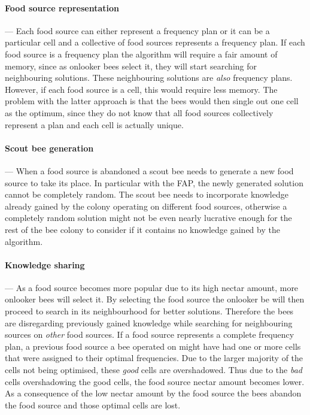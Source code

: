 \paragraph{Food source representation}
--- Each food source can either represent a frequency plan or it can be a particular cell and a collective of food sources represents a frequency plan. If each food source is a frequency plan the algorithm will require a fair amount of memory, since as onlooker bees select it, they will start searching for neighbouring solutions. These neighbouring solutions are \emph{also} frequency plans. However, if each food source is a cell, this would require less memory. The problem with the latter approach is that the bees would then single out one cell as the optimum, since they do not know that all food sources collectively represent a plan and each cell is actually unique.
\paragraph{Scout bee generation}
--- When a food source is abandoned a scout bee needs to generate a new food source to take its place. In particular with the \gls{FAP}, the newly generated solution cannot be completely random. The scout bee needs to incorporate knowledge already gained by the colony operating on different food sources, otherwise a completely random solution might not be even nearly lucrative enough for the rest of the bee colony to consider if it contains no knowledge gained by the algorithm.
\paragraph{Knowledge sharing}
--- As a food source becomes more popular due to its high nectar amount, more onlooker bees will select it. By selecting the food source the onlooker be will then proceed to search in its neighbourhood for better solutions. Therefore the bees are disregarding previously gained knowledge while searching for neighbouring sources on \emph{other} food sources. If a food source represents a complete frequency plan, a previous food source a bee operated on might have had one or more cells that were assigned to their optimal frequencies. Due to the larger majority of the cells not being optimised, these \emph{good} cells are overshadowed. Thus due to the \emph{bad} cells overshadowing the good cells, the food source nectar amount becomes lower. As a consequence of the low nectar amount by the food source the bees abandon the food source and those optimal cells are lost.

